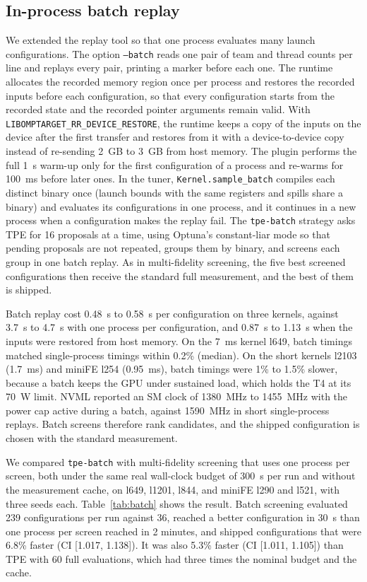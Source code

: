 \documentclass[10pt]{article}
\newcommand{\code}[1]{\texttt{#1}}
\begin{document}
\subsection{In-process batch replay}
\label{sec:batch}
We extended the replay tool so that one process evaluates many launch
configurations. The option \code{--batch} reads one pair of team and thread
counts per line and replays every pair, printing a marker before each one.
The runtime allocates the recorded memory region once per process and restores
the recorded inputs before each configuration, so that every configuration
starts from the recorded state and the recorded pointer arguments remain
valid. With \code{LIBOMPTARGET\_RR\_DEVICE\_RESTORE}, the runtime keeps a
copy of the inputs on the device after the first transfer and restores from it
with a device-to-device copy instead of re-sending 2~GB to 3~GB from host
memory. The plugin performs the full 1~s warm-up only for the first
configuration of a process and re-warms for 100~ms before later ones. In the
tuner, \code{Kernel.sample\_batch} compiles each distinct binary once (launch
bounds with the same registers and spills share a binary) and evaluates its
configurations in one process, and it continues in a new process when a
configuration makes the replay fail. The \code{tpe-batch} strategy asks TPE for
16 proposals at a time, using Optuna's constant-liar mode so that pending
proposals are not repeated, groups them by binary, and screens each group in
one batch replay. As in multi-fidelity screening, the five best screened
configurations then receive the standard full measurement, and the best of
them is shipped.

Batch replay cost 0.48~s to 0.58~s per configuration on three kernels, against
3.7~s to 4.7~s with one process per configuration, and 0.87~s to 1.13~s when
the inputs were restored from host memory. On the 7~ms kernel l649, batch
timings matched single-process timings within 0.2\% (median). On the short
kernels l2103 (1.7~ms) and miniFE l254 (0.95~ms), batch timings were 1\% to
1.5\% slower, because a batch keeps the GPU under sustained load, which holds
the T4 at its 70~W limit. NVML reported an SM clock of 1380~MHz to 1455~MHz with
the power cap active during a batch, against 1590~MHz in short single-process
replays. Batch screens therefore rank candidates, and the shipped
configuration is chosen with the standard measurement.

We compared \code{tpe-batch} with multi-fidelity screening that uses one
process per screen, both under the same real wall-clock budget of 300~s per
run and without the measurement cache, on l649, l1201, l844, and miniFE l290
and l521, with three seeds each. Table~\ref{tab:batch} shows the result. Batch
screening evaluated 239 configurations per run against 36, reached a better
configuration in 30~s than one process per screen reached in 2 minutes, and
shipped configurations that were 6.8\% faster (CI [1.017, 1.138]). It was also
5.3\% faster (CI [1.011, 1.105]) than TPE with 60 full evaluations, which had
three times the nominal budget and the cache.
\end{document}

